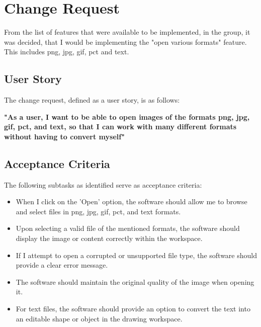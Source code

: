 \section{Change Request}
From the list of features that were available to be implemented, in the group, it was decided, that I would be implementing the "open various formats" feature. This includes png, jpg, gif, pct and text.

\subsection{User Story}
The change request, defined as a user story, is as follows:

\bf{"As a user, I want to be able to open images of the formats png, jpg, gif, pct, and text, so that I can work with many different formats without having to convert myself"}

\subsection{Acceptance Criteria}
The following subtasks as identified serve as acceptance criteria:
\bf{%
    \begin{itemize}
        \item When I click on the 'Open' option, the software should allow me to browse and select files in png, jpg, gif, pct, and text formats.
        \item Upon selecting a valid file of the mentioned formats, the software should display the image or content correctly within the workspace.
        \item If I attempt to open a corrupted or unsupported file type, the software should provide a clear error message.
        \item The software should maintain the original quality of the image when opening it.
        \item For text files, the software should provide an option to convert the text into an editable shape or object in the drawing workspace.
    \end{itemize}
}